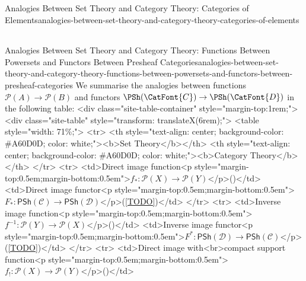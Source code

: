 \begin{remark}{Analogies Between Set Theory and Category Theory: Categories of Elements}{analogies-between-set-theory-and-category-theory-categories-of-elements}
\begin{center}
\begin{tabular}{|Sc|Sc|}
             &  \\\hline
        \end{tabular}
    \end{center}
    \endgroup
\end{remark}
\begin{remark}{Analogies Between Set Theory and Category Theory: Functions Between Powersets and Functors Between Presheaf Categories}{analogies-between-set-theory-and-category-theory-functions-between-powersets-and-functors-between-presheaf-categories}%
    We summarise the analogies between functions $\mathcal{P}(A)\to\mathcal{P}(B)$ and functors $\PSh(\CatFont{C})\to\PSh(\CatFont{D})$ in the following table:
    <div class="site-table-container" style="margin-top:1rem;">
      <div class="site-table" style="transform: translateX(6rem);">
        <table style="width: 71\%;">
          <tr>
            <th style="text-align: center; background-color: #A60D0D; color: white;"><b>Set Theory</b></th>
            <th style="text-align: center; background-color: #A60D0D; color: white;"><b>Category Theory</b></th>
          </tr>
          <tr>
            <td>Direct image function<p style="margin-top:0.5em;margin-bottom:0.5em">$f_{*}\colon\mathcal{P}(X)\to\mathcal{P}(Y)$</p>()</td>
            <td>Direct image functor<p style="margin-top:0.5em;margin-bottom:0.5em">$F_{*}\colon\mathsf{PSh}(\mathcal{C})\to\mathsf{PSh}(\mathcal{D})$</p>(\cref{TODO})</td>
          </tr>
          <tr>
            <td>Inverse image function<p style="margin-top:0.5em;margin-bottom:0.5em">$f^{-1}\colon\mathcal{P}(Y)\to\mathcal{P}(X)$</p>()</td>
            <td>Inverse image functor<p style="margin-top:0.5em;margin-bottom:0.5em">$F^{*}\colon\mathsf{PSh}(\mathcal{D})\to\mathsf{PSh}(\mathcal{C})$</p>(\cref{TODO})</td>
          </tr>
          <tr>
            <td>Direct image with<br>compact support function<p style="margin-top:0.5em;margin-bottom:0.5em">$f_{!}\colon\mathcal{P}(X)\to\mathcal{P}(Y)$</p>()</td>

\end{remark}

